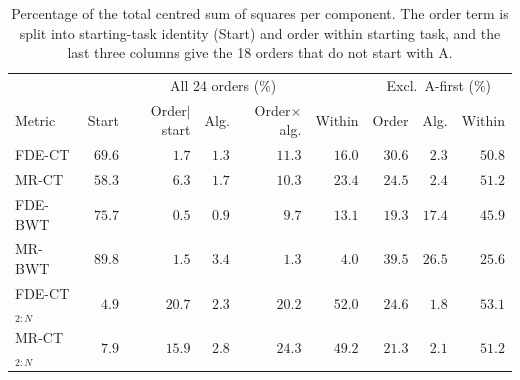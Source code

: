 \begin{table}[!t]
\centering
\caption{Percentage of the total centred sum of squares per component. The order term is split into starting-task identity (Start) and order within starting task, and the last three columns give the 18 orders that do not start with A.}
\label{tab:decomposition}
\setlength{\tabcolsep}{1.8pt}
\footnotesize
\begin{tabular*}{\columnwidth}{@{\extracolsep{\fill}}lrrrrrrrr@{}}
\toprule
 & \multicolumn{5}{c}{All 24 orders (\%)} & \multicolumn{3}{c}{Excl.\ A-first (\%)} \\
\cmidrule(lr){2-6}\cmidrule(lr){7-9}
Metric & Start & \shortstack{Order$\mid$\\start} & Alg. & \shortstack{Order$\times$\\alg.} & Within & Order & Alg. & Within \\
\midrule
FDE-CT & $69.6$ & $1.7$ & $1.3$ & $11.3$ & $16.0$ & $30.6$ & $2.3$ & $50.8$ \\
MR-CT & $58.3$ & $6.3$ & $1.7$ & $10.3$ & $23.4$ & $24.5$ & $2.4$ & $51.2$ \\
FDE-BWT & $75.7$ & $0.5$ & $0.9$ & $9.7$ & $13.1$ & $19.3$ & $17.4$ & $45.9$ \\
MR-BWT & $89.8$ & $1.5$ & $3.4$ & $1.3$ & $4.0$ & $39.5$ & $26.5$ & $25.6$ \\
\midrule
FDE-CT$_{2:N}$ & $4.9$ & $20.7$ & $2.3$ & $20.2$ & $52.0$ & $24.6$ & $1.8$ & $53.1$ \\
MR-CT$_{2:N}$ & $7.9$ & $15.9$ & $2.8$ & $24.3$ & $49.2$ & $21.3$ & $2.1$ & $51.2$ \\
\bottomrule
\end{tabular*}
\end{table}

